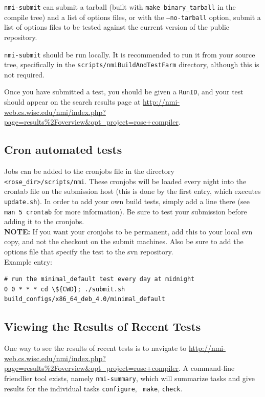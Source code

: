 {\tt nmi-submit} can submit a tarball (built with {\tt make
binary\_tarball} in the compile tree) and a list of options files, or with the
{\tt --no-tarball} option, submit a list of options files to be tested against
the current version of the public repository.

{\tt nmi-submit} should be run locally.  It is recommended to run it from your
source tree, specifically in the {\tt scripts/nmiBuildAndTestFarm} directory,
although this is not required.

Once you have submitted a test, you should be given a {\tt RunID}, and your test
should appear on the search results page at
\url{http://nmi-web.cs.wisc.edu/nmi/index.php?page=results\%2Foverview&opt\_project=rose+compiler}.


\subsection{Cron automated tests}%
Jobs can be added to the cronjobs file in the directory {\tt
<rose\_dir>/scripts/nmi}. These cronjobs will be loaded every night into the
crontab file on the submission host (this is done by the first entry, which
executes {\tt update.sh}). In order to add your own build tests, simply add a
line there (see {\tt man 5 crontab} for more information). Be sure to test your
submission before adding it to the cronjobs.\\

{\bf NOTE:} If you want your cronjobs to be permanent, add this to your local svn
copy, and not the checkout on the submit machines. Also be sure to add the 
options file that specify the test to the svn repository.\\

Example entry:
\begin{verbatim}
# run the minimal_default test every day at midnight
0 0 * * * cd \${CWD}; ./submit.sh build_configs/x86_64_deb_4.0/minimal_default
\end{verbatim}%


\subsection{Viewing the Results of Recent Tests}
\label{sec:nmi-summary}

One way to see the results of recent tests is to navigate to
\url{http://nmi-web.cs.wisc.edu/nmi/index.php?page=results\%2Foverview&opt\_project=rose+compiler}.
A command-line friendlier tool exists, namely {\tt nmi-summary}, which will
summarize tasks and give results for the individual tasks {\tt configure}, {\tt
make}, {\tt check}.

